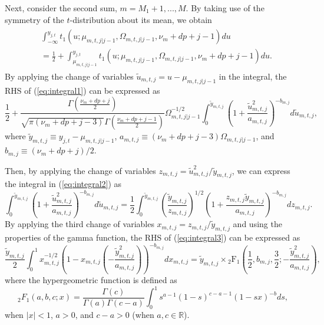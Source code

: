 \documentclass[nojss]{jss} %
\begin{document}
\begin{appendix}
Next, consider the second sum,  $m=M_1+1,...,M$. By taking use of the symmetry of the $t$-distribution about its mean, we obtain
\begin{align}\label{eq:integral1}
\begin{aligned}
&\int_{-\infty}^{y_{j,t}}t_1(u;\mu_{m,t,j|j-1},\Omega_{m,t,j|j-1},\nu_m + dp + j - 1)du \\
&= \frac{1}{2} + \int_{\mu_{m,t,j|j-1}}^{y_{j,t}}t_1(u;\mu_{m,t,j|j-1},\Omega_{m,t,j|j-1},\nu_m + dp + j - 1)du.
\end{aligned}
\end{align}
By applying the change of variables $\tilde{u}_{m,t,j} = u - \mu_{m,t,j|j-1}$ in the integral, the RHS of (\ref{eq:integral1}) can be expressed as
\begin{equation}\label{eq:integral2}
\frac{1}{2} + \frac{\Gamma\left(\frac{\nu_m + dp + j}{2}\right)}{\sqrt{\pi (\nu_m + dp + j - 3)}\Gamma\left(\frac{\nu_m + dp + j - 1}{2} \right)}\Omega_{m,t,j|j-1}^{-1/2}\int_{0}^{\tilde{y}_{m,t,j}}\left(1 + \frac{\tilde{u}_{m,t,j}^2}{a_{m,t,j}} \right)^{-b_{m,j}}d\tilde{u}_{m,t,j},
\end{equation}
where $\tilde{y}_{m,t,j} \equiv y_{j,t} - \mu_{m,t,j|j-1}$,  $a_{m,t,j} \equiv (\nu_m + dp + j - 3)\Omega_{m,t,j|j-1}$, and $b_{m,j}\equiv (\nu_m + dp + j)/2$.

Then, by applying the change of variables $z_{m,t,j} =  \tilde{u}_{m,t,j}^2/\tilde{y}_{m,t,j}$,  we can express the integral in (\ref{eq:integral2}) as
\begin{equation}\label{eq:integral3}
\int_{0}^{\tilde{y}_{m,t,j}}\left(1 + \frac{\tilde{u}_{m,t,j}^2}{a_{m,t,j}} \right)^{-b_{m,j}}d\tilde{u}_{m,t,j} = \frac{1}{2}\int_{0}^{\tilde{y}_{m,t,j}}\left(\frac{\tilde{y}_{m,t,j}}{z_{m,t,j}}  \right)^{1/2}\left(1 + \frac{z_{m,t,j}\tilde{y}_{m,t,j}}{a_{m,t,j}} \right)^{-b_{m,j}}dz_{m,t,j}.
\end{equation}
By applying the third change of variables $x_{m,t,j}=z_{m,t,j}/\tilde{y}_{m,t,j}$ and using the properties of the gamma function,  the RHS of (\ref{eq:integral3}) can be expressed as
\begin{equation}
\frac{\tilde{y}_{m,t,j}}{2}\int_0^1 x_{m,t,j}^{-1/2}\left(1 - x_{m,t,j}\left(-\frac{\tilde{y}_{m,t,j}^2}{a_{m,t,j}}\right)  \right)^{-b_{m,j}}dx_{m,t,j} = \tilde{y}_{m,t,j} \times {}_2\text{F}_1\left(\frac{1}{2}, b_{m,j}, \frac{3}{2}; -\frac{\tilde{y}_{m,t,j}^2}{a_{m,t,j}} \right),
\end{equation}
where the hypergeometric function is defined as \citep[Section 1.3.1]{Aomoto+Kita:2011}
\begin{equation}
{}_2F_1(a,b,c;x)=\frac{\Gamma(c)}{\Gamma(a)\Gamma(c-a)}\int_0^1 s^{a-1}(1-s)^{c-a-1}(1-sx)^{-b}ds,
\end{equation}
when $|x|<1$, $a>0$, and $c-a>0$ (when $a,c\in\mathbb{R}$).


\end{appendix}
\end{document}
